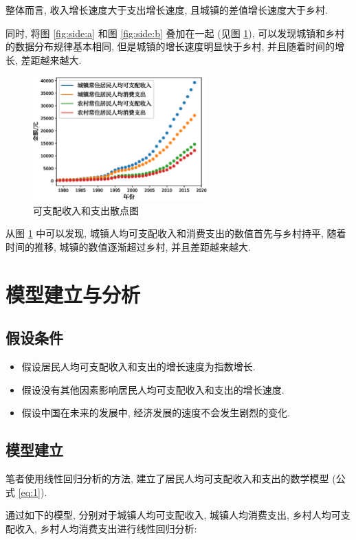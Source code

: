 \documentclass{article}
\begin{document}
\par 整体而言, 收入增长速度大于支出增长速度, 且城镇的差值增长速度大于乡村.\\
\par 同时, 将图 \ref{fig:side:a} 和图 \ref{fig:side:b} 叠加在一起 (见图 \ref{fig:side:c}), 可以发现城镇和乡村的数据分布规律基本相同, 但是城镇的增长速度明显快于乡村, 并且随着时间的增长, 差距越来越大.\\
\begin{figure}[H]
  \centering
  \includegraphics[width=0.6\textwidth]{figures/plot1.eps}
  \caption{可支配收入和支出散点图}
  \label{fig:side:c}
\end{figure}
从图 \ref{fig:side:c} 中可以发现, 城镇人均可支配收入和消费支出的数值首先与乡村持平, 随着时间的推移, 城镇的数值逐渐超过乡村, 并且差距越来越大.\\

\section{模型建立与分析}\label{sec:model}

\subsection{假设条件}

\begin{itemize}
  \item 假设居民人均可支配收入和支出的增长速度为指数增长.
  \item 假设没有其他因素影响居民人均可支配收入和支出的增长速度.
  \item 假设中国在未来的发展中, 经济发展的速度不会发生剧烈的变化.
\end{itemize}

\subsection{模型建立}
\par 笔者使用线性回归分析的方法, 建立了居民人均可支配收入和支出的数学模型 (公式 \ref{eq:1}).\\
\par 通过如下的模型, 分别对于城镇人均可支配收入, 城镇人均消费支出, 乡村人均可支配收入, 乡村人均消费支出进行线性回归分析:
\end{document}
